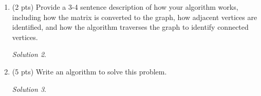 \documentclass[12pt]{article}
\theoremstyle{remark}
\newtheorem*{solution}{Solution}
\begin{document}
\begin{enumerate}
\begin{enumerate}
    \begin{solution}

    \end{solution}
\pagebreak
    
    \item (2 pts) Provide a 3-4 sentence description of how your algorithm works, including how the matrix is converted to the graph, how adjacent vertices are identified, and how the algorithm traverses the graph to identify connected vertices.
    
    \begin{solution}

    \end{solution}
    
    \item (5 pts) Write an algorithm to solve this problem. 
    
    \begin{solution}

    \end{solution}
    
\end{enumerate}


\end{enumerate}
\end{document}
